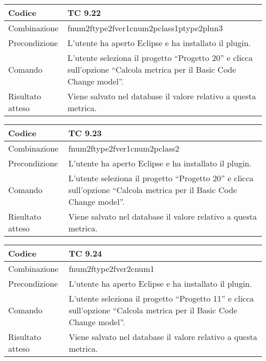 \begin{table}[ht]
\begin{tabular}{|p{3cm}|p{9cm}|}
\hline
\cellcolor{lightgray}Codice				& TC 9.22								\\
\hline
\cellcolor{lightgray}Combinazione		& fnum2ftype2fver1cnum2pclass1ptype2plun3									\\
\hline
\cellcolor{lightgray}Precondizione		& L'utente ha aperto Eclipse e ha installato il plugin.		\\
\hline
\cellcolor{lightgray}Comando			& L'utente seleziona il progetto ``Progetto 20''  e clicca sull'opzione ``Calcola metrica per il Basic Code Change model''.	\\
\hline
\cellcolor{lightgray}Risultato atteso	& Viene salvato nel database il valore relativo a questa metrica.\\
\hline
\end{tabular}
\end{table}


\clearpage

\begin{table}[ht]
\begin{tabular}{|p{3cm}|p{9cm}|}
\hline
\cellcolor{lightgray}Codice				& TC 9.23								\\
\hline
\cellcolor{lightgray}Combinazione		& fnum2ftype2fver1cnum2pclass2									\\
\hline
\cellcolor{lightgray}Precondizione		& L'utente ha aperto Eclipse e ha installato il plugin.		\\
\hline
\cellcolor{lightgray}Comando			& L'utente seleziona il progetto ``Progetto 20''  e clicca sull'opzione ``Calcola metrica per il Basic Code Change model''.	\\
\hline
\cellcolor{lightgray}Risultato atteso	& Viene salvato nel database il valore relativo a questa metrica.\\
\hline
\end{tabular}
\end{table}

\begin{table}[ht]
\begin{tabular}{|p{3cm}|p{9cm}|}
\hline
\cellcolor{lightgray}Codice				& TC 9.24								\\
\hline
\cellcolor{lightgray}Combinazione		& fnum2ftype2fver2cnum1									\\
\hline
\cellcolor{lightgray}Precondizione		& L'utente ha aperto Eclipse e ha installato il plugin.		\\
\hline
\cellcolor{lightgray}Comando			& L'utente seleziona il progetto ``Progetto 11''  e clicca sull'opzione ``Calcola metrica per il Basic Code Change model''.	\\
\hline
\cellcolor{lightgray}Risultato atteso	& Viene salvato nel database il valore relativo a questa metrica.\\
\hline
\end{tabular}
\end{table}

